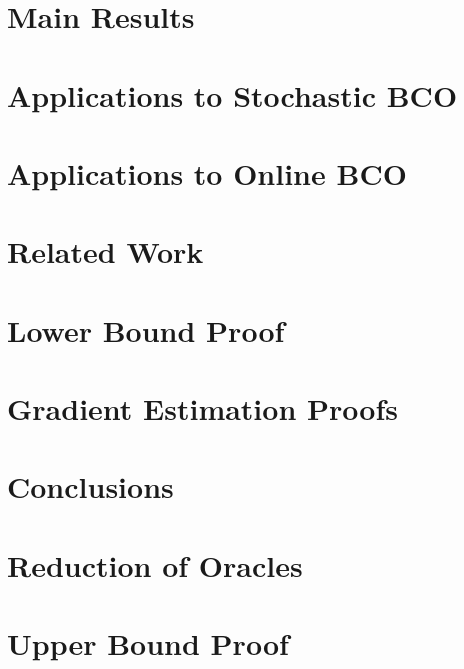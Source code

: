 \documentclass[twoside,11pt]{article}
\begin{document}
\section{Main Results}
\label{sec:results}


\section{Applications to Stochastic BCO}
\label{sec:sbco}


\section{Applications to Online BCO}
\label{sec:obco}


\section{Related Work}
\label{sec:related}



%

\section{Lower Bound Proof}
\label{sec:appendix-lb-proof}



\section{Gradient Estimation Proofs}
\label{sec:appendix-grad}



\section{Conclusions}
\label{sec:conc}


\appendix

\section{Reduction of Oracles}
\label{sec:orrel}


\section{Upper Bound Proof}
\label{sec:appendix-md}

\end{document}
